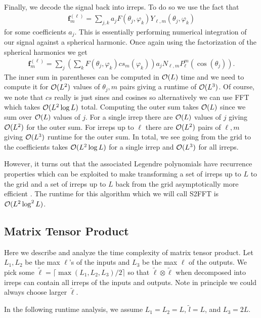 Finally, we decode the signal back into irreps. To do so we use the fact that
\begin{align}\mathbf{f}^{(\ell)}_m=\sum_{j,k}a_j F(\theta_j,\varphi_k)Y_{\ell,m}(\theta_j,\varphi_k)\end{align}
for some coefficients $a_j$. This is essentially performing numerical integration of our signal against a spherical harmonic. Once again using the factorization of the spherical harmonics we get
\begin{align}\mathbf{f}^{(\ell)}_m=\sum_j\left(\sum_{k} F(\theta_j,\varphi_k)cs_m(\varphi_k)\right)a_j N_{\ell,m}P^{m}_\ell(\cos(\theta_j)).\end{align}
The inner sum in parentheses can be computed in $\mathcal{O}(L)$ time and we need to compute it for $\mathcal{O}(L^2)$ values of $\theta_j,m$ pairs giving a runtime of $\mathcal{O}(L^3)$. Of course, we note that $cs$ really is just sines and cosines so alternatively we can use FFT which takes $\mathcal{O}(L^2\log L)$ total. Computing the outer sum takes $\mathcal{O}(L)$ since we sum over $\mathcal{O}(L)$ values of $j$. For a single irrep there are $\mathcal{O}(L)$ values of $j$ giving $\mathcal{O}(L^2)$ for the outer sum. For irreps up to $\ell$ there are $\mathcal{O}(L^2)$ pairs of $\ell,m$ giving $\mathcal{O}(L^3)$ runtime for the outer sum. In total, we see going from the grid to the coefficients takes $\mathcal{O}(L^2\log L)$ for a single irrep and $\mathcal{O}(L^3)$ for all irreps.

However, it turns out that the associated Legendre polynomials have recurrence properties which can be exploited to make transforming a set of irreps up to $L$ to the grid and a set of irreps up to $L$ back from the grid asymptotically more efficient \cite{healy2003ffts}. The runtime for this algorithm which we will call S2FFT is $\mathcal{O}(L^2\log^2 L)$.

\subsection{Matrix Tensor Product}
\label{sec:FTP_runtime}

Here we describe and analyze the time complexity of matrix tensor product. Let $L_1,L_2$ be the max $\ell$'s of the inputs and $L_3$ be the max $\ell$ of the outputs. We pick some $\tilde{\ell}=\lceil\max(L_1,L_2,L_3)/2\rceil$ so that $\tilde{\ell}\otimes\tilde{\ell}$ when decomposed into irreps can contain all irreps of the inputs and outputs. Note in principle we could always choose larger $\tilde{\ell}$.

In the following runtime analysis, we assume $L_1=L_2=L$, $\tilde{l}=L$, and $L_3=2L$.

